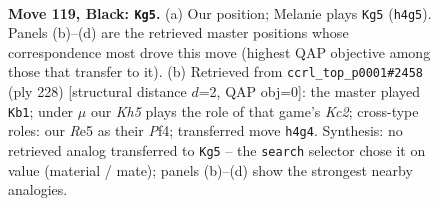 \documentclass[11pt]{article}
\begin{document}
\begin{figure}[p]\centering
\begin{subfigure}{0.46\textwidth}\centering
\resizebox{\linewidth}{!}{%
\newchessgame
\chessboard[
  setfen={7K/8/8/4r3/7k/8/8/8 b - - 23 119},
  showmover=false,
  pgfstyle=straightmove, color=movearrow, markmove={h4-g5}
]}
\caption{}
\end{subfigure}\hfill
\begin{subfigure}{0.46\textwidth}\centering
\resizebox{\linewidth}{!}{%
\newchessgame
\chessboard[
  setfen={8/8/8/2k5/5P2/8/2K5/8 w - - 0 115},
  showmover=false,
  pgfstyle=straightmove, color=movearrow, markmove={c2-b1}
]}
\caption{}
\end{subfigure}
\\[4pt]

\caption{\textbf{Move 119, Black: \texttt{Kg5}.} (a) Our position; Melanie plays \texttt{Kg5} (\texttt{h4g5}). Panels (b)--(d) are the retrieved master positions whose correspondence most drove this move (highest QAP objective among those that transfer to it). (b) Retrieved from \texttt{ccrl\_top\_p0001\#2458} (ply 228) [structural distance $d$=2, QAP obj=0]: the master played \texttt{Kb1}; under $\mu$ our \emph{Kh5} plays the role of that game's \emph{Kc2}; cross-type roles: our \emph{R}e5 as their \emph{P}f4; transferred move \texttt{h4g4}. Synthesis: no retrieved analog transferred to \texttt{Kg5} -- the \texttt{search} selector chose it on value (material / mate); panels (b)--(d) show the strongest nearby analogies.}
\label{fig:thought-m237}
\end{figure}

\clearpage
\end{document}
